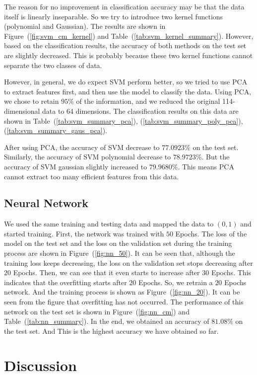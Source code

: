 \documentclass[11pt, a4paper, jou]{apa7}
\begin{document}
    The reason for no improvement in classification accuracy may be that the data itself is linearly inseparable. So we try to introduce two kernel functions (polynomial and Gaussian). The results are shown in Figure~(\ref{fig:svm_cm_kernel}) and Table~(\ref{tab:svm_kernel_summary}). However, based on the classification results, the accuracy of both methods on the test set are slightly decreased. This is probably because these two kernel functions cannot separate the two classes of data. 

    However, in general, we do expect SVM perform better, so we tried to use PCA to extract features first, and then use the model to classify the data. Using PCA, we chose to retain $95\%$ of the information, and we reduced the original 114-dimensional data to 64 dimensions. The classification results on this data are shown in Table~(\ref{tab:svm_summary_pca}), (\ref{tab:svm_summary_poly_pca}), (\ref{tab:svm_summary_gaus_pca}). 

    After using PCA, the accuracy of SVM decrease to $77.0923\%$ on the test set. Similarly, the accuracy of SVM polynomial decrease to $78.9723\%$. But the accuracy of SVM gaussian slightly increased to $79.9680\%$. This means PCA cannot extract too many efficient features from this data.

\subsection{Neural Network}
We used the same training and testing data and mapped the data to $(0,1)$ and started training. First, the network was trained with $50$ Epochs. The loss of the model on the test set and the loss on the validation set during the training process are shown in Figure~(\ref{fig:nn_50}). It can be seen that, although the training loss keeps decreasing, the loss on the validation set stops decreasing after $20$ Epochs. Then, we can see that it even starts to increase after $30$ Epochs. This indicates that the overfitting starts after $20$ Epochs. So, we retrain a $20$ Epochs network. And the training process is shown as Figure~(\ref{fig:nn_20}). It can be seen from the figure that overfitting has not occurred. The performance of this network on the test set is shown in Figure~(\ref{fig:nn_cm}) and Table~(\ref{tab:nn_summary}). In the end, we obtained an accuracy of $81.08\%$ on the test set. And This is the highest accuracy we have obtained so far.

\section{Discussion}
\end{document}
